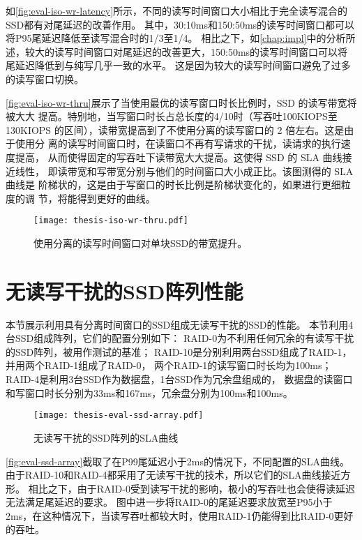 如\autoref{fig:eval-iso-wr-latency}所示，不同的读写时间窗口大小相比于完全读写混合的SSD都有对尾延迟的改善作用。
其中，30:10ms和150:50ms的读写时间窗口都可以将P95尾延迟降低至读写混合时的1/3至1/4。
相比之下，如\autoref{chap:impl}中的分析所述，较大的读写时间窗口对尾延迟的改善更大，150:50ms的读写时间窗口可以将尾延迟降低到与纯写几乎一致的水平。
这是因为较大的读写时间窗口避免了过多的读写窗口切换。


\autoref{fig:eval-iso-wr-thru}展示了当使用最优的读写窗口时长比例时，SSD 的读写带宽将被大大
提高。特别地，当写窗口时长占总长度的4/10时（写吞吐100KIOPS至130KIOPS
的区间），读带宽提高到了不使用分离的读写窗口的 2 倍左右。这是由于使用分
离的读写时间窗口时，在读窗口不再有写请求的干扰，读请求的执行速度提高，
从而使得固定的写吞吐下读带宽大大提高。这使得 SSD 的 SLA 曲线接近线性，
即读带宽和写带宽分别与他们的时间窗口大小成正比。该图测得的 SLA 曲线是
阶梯状的，这是由于写窗口的时长比例是阶梯状变化的，如果进行更细粒度的调
节，将能得到更好的曲线。

\begin{figure}[h]
  \centering
  \texttt{[image: thesis-iso-wr-thru.pdf]}
  \caption{
        使用分离的读写时间窗口对单块SSD的带宽提升。
      }
  \label{fig:eval-iso-wr-thru}
\end{figure}


\section{无读写干扰的SSD阵列性能}
\label{sec:eval-ssd-array}

本节展示利用具有分离时间窗口的SSD组成无读写干扰的SSD的性能。
本节利用4台SSD组成阵列，它们的配置分别如下：
RAID-0为不利用任何冗余的有读写干扰的SSD阵列，被用作测试的基准；
RAID-10是分别利用两台SSD组成了RAID-1，并用两个RAID-1组成了RAID-0，
两个RAID-1的读写窗口时长均为100ms；
RAID-4是利用3台SSD作为数据盘，1台SSD作为冗余盘组成的，
数据盘的读窗口和写窗口时长分别为33ms和167ms，冗余盘分别为100ms和100ms。

\begin{figure}[h]
  \centering
  \texttt{[image: thesis-eval-ssd-array.pdf]}
  \caption{
        无读写干扰的SSD阵列的SLA曲线
      }
  \label{fig:eval-ssd-array}
\end{figure}

\autoref{fig:eval-ssd-array}截取了在P99尾延迟小于2ms的情况下，不同配置的SLA曲线。
由于RAID-10和RAID-4都采用了无读写干扰的技术，所以它们的SLA曲线接近方形。
相比之下，由于RAID-0受到读写干扰的影响，极小的写吞吐也会使得读延迟无法满足尾延迟的要求。
图中进一步将RAID-0的尾延迟要求放宽至P95小于2ms，在这种情况下，当读写吞吐都较大时，使用RAID-1仍能得到比RAID-0更好的吞吐。

